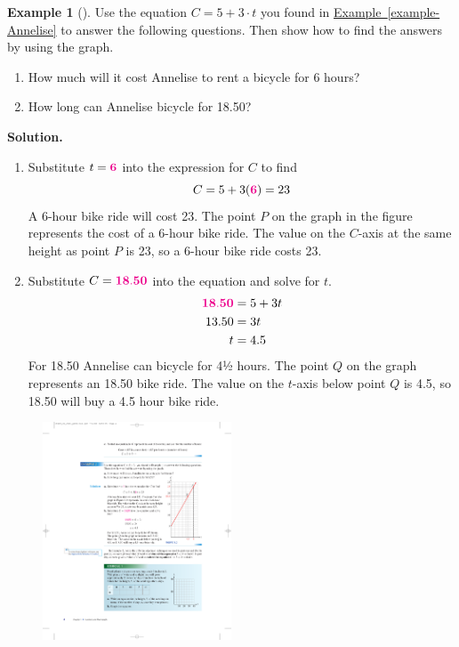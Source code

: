 \documentclass[10pt,]{book}
\theoremstyle{plain}
\theoremstyle{definition}
\theoremstyle{definition}
\newtheorem{example}[theorem]{Example}
\theoremstyle{definition}
\theoremstyle{definition}
\numberwithin{equation}{section}
\newcommand{\alert}[1]{\mathbf{\color{magenta}{#1}}}
\newcommand{\amp}{ & }
\begin{document}
\begin{example}[]\label{example-6hrbike}
Use the equation \(C=5+3\cdot t\) you found in \hyperref[example-Annelise]{Example~\ref{example-Annelise}} to answer the following questions.  Then show how to find the answers by using the graph.%
\leavevmode%
\begin{enumerate}[label=*\alph**]
\item\hypertarget{li-19}{}How much will it cost Annelise to rent a bicycle for 6 hours?%
\item\hypertarget{li-20}{}How long can Annelise bicycle for \textdollar{}18.50?%
\end{enumerate}
\par\medskip\noindent%
\textbf{Solution.}\quad \leavevmode%
\begin{enumerate}[label=*\alph**]
\item\hypertarget{li-21}{}Substitute \(t=\alert{6}\) into the expression for \(C\) to find \begin{equation*}C=5+3(\alert{6})=23\end{equation*}A 6-hour bike ride will cost \textdollar{}23.  The point \(P\) on the graph in the figure represents the cost of a 6-hour bike ride.  The value on the \(C\)-axis at the same height as point \(P\) is 23, so a 6-hour bike ride costs \textdollar{}23.%
\item\hypertarget{li-22}{}Substitute \(C=\alert{18.50}\) into the equation and solve for \(t\).
        \begin{align*}
\alert{18.50}\amp=5+3t\\
13.50\amp=3t\\
t\amp=4.5
\end{align*}
        For \textdollar{}18.50 Annelise can bicycle for 4½ hours. The point \(Q\)  on the graph represents an \textdollar{}18.50 bike ride.  The value on the \(t\)-axis below point \(Q\) is 4.5, so \textdollar{}18.50 will buy a 4.5 hour bike ride.%
\end{enumerate}
\leavevmode%
\begin{figure}
\centering
\includegraphics[width=0.50\textwidth,]{images/fig1-2.pdf}\end{figure}
\end{example}
\end{document}
